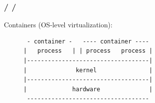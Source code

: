 \documentclass{beamer}
\newcommand{\autotitle}
{\frametitle{
    \secname
    \ifx\insertsubsection\empty
    \else
        /\subsecname
        \ifx\insertsubsubsection\empty\else/\subsubsecname\fi
    \fi}}
\begin{document}
\begin{frame}[fragile]
    \autotitle
    Containers (OS-level virtualization):
    \begin{figure}
        \centering
        \begin{varwidth}{\linewidth}
            \begin{verbatim}
 - container -   ---- container ----
|   process   | | process   process |
|-----------------------------------|
|              kernel               |
|-----------------------------------|
|             hardware              |
 -----------------------------------
            \end{verbatim}
        \end{varwidth}
    \end{figure}
\end{frame}
\end{document}
